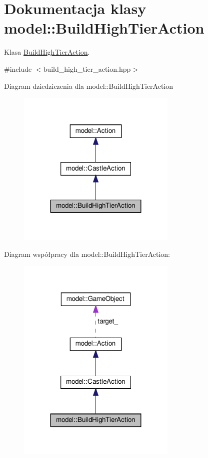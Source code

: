 \hypertarget{classmodel_1_1BuildHighTierAction}{}\section{Dokumentacja klasy model\+:\+:Build\+High\+Tier\+Action}
\label{classmodel_1_1BuildHighTierAction}


Klasa \hyperlink{classmodel_1_1BuildHighTierAction}{Build\+High\+Tier\+Action}.  




{\ttfamily \#include $<$build\+\_\+high\+\_\+tier\+\_\+action.\+hpp$>$}



Diagram dziedziczenia dla model\+:\+:Build\+High\+Tier\+Action\nopagebreak
\begin{figure}[H]
\begin{center}
\leavevmode
\includegraphics[width=215pt]{classmodel_1_1BuildHighTierAction__inherit__graph}
\end{center}
\end{figure}


Diagram współpracy dla model\+:\+:Build\+High\+Tier\+Action\+:\nopagebreak
\begin{figure}[H]
\begin{center}
\leavevmode
\includegraphics[width=215pt]{classmodel_1_1BuildHighTierAction__coll__graph}
\end{center}
\end{figure}
